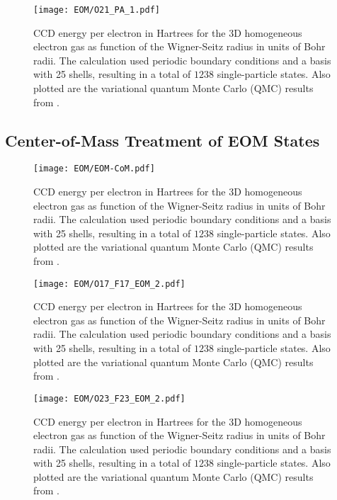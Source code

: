 \documentclass[thesis.tex]{subfiles}
\begin{document}
\begin{figure}[h]
  \texttt{[image: EOM/O21\_PA\_1.pdf]}
  \caption{CCD energy per electron in Hartrees for the 3D homogeneous electron gas as function of the Wigner-Seitz radius in units of Bohr radii. The calculation used periodic boundary conditions and a basis with 25 shells, resulting in a total of $1238$ single-particle states. Also plotted are the variational quantum Monte Carlo (QMC) results from \cite{LOPEZ2006}.}
  \label{fig:QDground}
\end{figure}

\subsection{Center-of-Mass Treatment of EOM States} \label{section:eom_nuclei}

\begin{figure}[h]
  \texttt{[image: EOM/EOM-CoM.pdf]}
  \caption{CCD energy per electron in Hartrees for the 3D homogeneous electron gas as function of the Wigner-Seitz radius in units of Bohr radii. The calculation used periodic boundary conditions and a basis with 25 shells, resulting in a total of $1238$ single-particle states. Also plotted are the variational quantum Monte Carlo (QMC) results from \cite{LOPEZ2006}.}
  \label{fig:QDground}
\end{figure}

\begin{figure}[h]
  \texttt{[image: EOM/O17\_F17\_EOM\_2.pdf]}
  \caption{CCD energy per electron in Hartrees for the 3D homogeneous electron gas as function of the Wigner-Seitz radius in units of Bohr radii. The calculation used periodic boundary conditions and a basis with 25 shells, resulting in a total of $1238$ single-particle states. Also plotted are the variational quantum Monte Carlo (QMC) results from \cite{LOPEZ2006}.}
  \label{fig:QDground}
\end{figure}

\begin{figure}[h]
  \texttt{[image: EOM/O23\_F23\_EOM\_2.pdf]}
  \caption{CCD energy per electron in Hartrees for the 3D homogeneous electron gas as function of the Wigner-Seitz radius in units of Bohr radii. The calculation used periodic boundary conditions and a basis with 25 shells, resulting in a total of $1238$ single-particle states. Also plotted are the variational quantum Monte Carlo (QMC) results from \cite{LOPEZ2006}.}
  \label{fig:QDground}
\end{figure}
\end{document}
